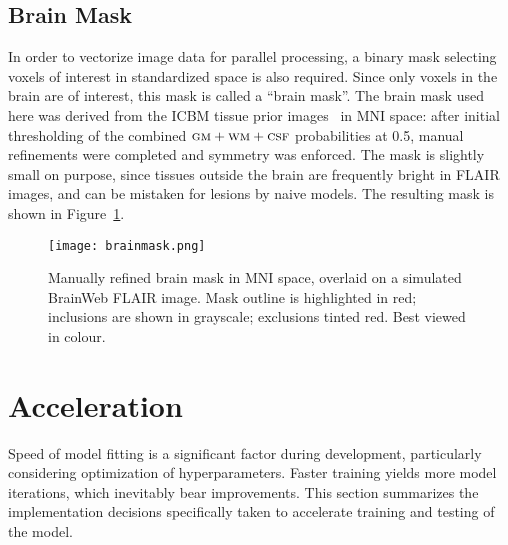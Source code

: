\subsection{Brain Mask}\label{ss:brainmask}
In order to vectorize image data for parallel processing,
a binary mask selecting voxels of interest in standardized space is also required.
Since only voxels in the brain are of interest, this mask is called a ``brain mask''.
The brain mask used here was derived from
the ICBM tissue prior images~\cite{Mazziotta2001} in MNI space:
after initial thresholding of the combined $\textsc{gm}{}+\textsc{wm}{}+\textsc{csf}{}$ probabilities at 0.5,
manual refinements were completed and symmetry was enforced.
The mask is slightly small on purpose,
since tissues outside the brain are frequently bright in FLAIR images,
and can be mistaken for lesions by naive models.
The resulting mask is shown in Figure~\ref{fig:brainmask}.
\begin{figure}
  \centering
  \texttt{[image: brainmask.png]}
  \caption{Manually refined brain mask in MNI space, overlaid on a simulated BrainWeb FLAIR image.
    Mask outline is highlighted in red; inclusions are shown in grayscale; exclusions tinted red.
    Best viewed in colour.}%
  \label{fig:brainmask}
\end{figure}
\section{Acceleration}
Speed of model fitting is a significant factor during development,
particularly considering optimization of hyperparameters.
Faster training yields more model iterations, which inevitably bear improvements.
This section summarizes the implementation decisions
specifically taken to accelerate training and testing of the model.
